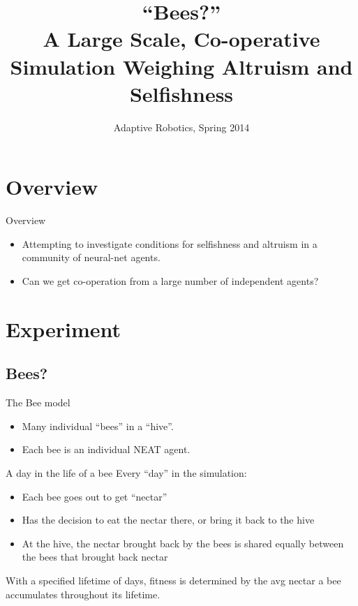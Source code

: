 \documentclass{beamer}
\title[Bees?]{``Bees?''\\ A Large Scale, Co-operative Simulation Weighing
                          Altruism and Selfishness}
\institute{Swarthmore College}
\date{Adaptive Robotics, Spring 2014}
\begin{document}
    \begin{frame}
        \titlepage
    \end{frame}

    \begin{frame}
        \tableofcontents
    \end{frame}


    \section{Overview}

    \begin{frame}{Overview}
        \begin{itemize}
            \item Attempting to investigate conditions for selfishness and altruism in a community
                  of neural-net agents.
            \item Can we get co-operation from a large number of independent agents?
        \end{itemize}
    \end{frame}

    \section{Experiment}

    \subsection{Bees?}
    \begin{frame}{The Bee model}
        \begin{itemize}
            \item Many individual ``bees'' in a ``hive''.
            \item Each bee is an individual NEAT agent.
        \end{itemize}
    \end{frame}

    \begin{frame}{A day in the life of a bee}
        Every ``day'' in the simulation:
        \begin{itemize}
            \item Each bee goes out to get ``nectar''
            \item Has the decision to eat the nectar there, or bring it back to the hive
            \item At the hive, the nectar brought back by the bees is shared equally between 
                  the bees that brought back nectar
        \end{itemize}
        With a specified lifetime of days, fitness is determined by the avg nectar a bee accumulates throughout its lifetime.
    \end{frame}
\end{document}
